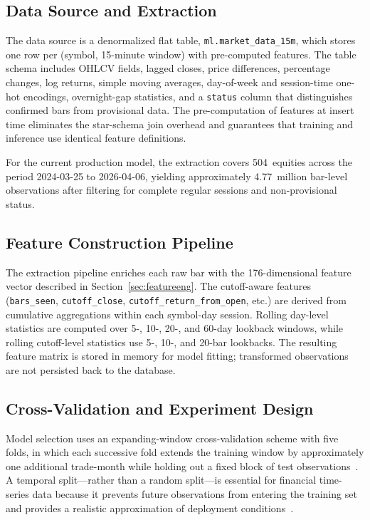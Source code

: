 \documentclass[conference]{IEEEtran}
\begin{document}
\subsection{Data Source and Extraction}\label{sec:datasource}

The data source is a denormalized flat table, \texttt{ml.market\_data\_15m}, which stores one row per (symbol, 15-minute window) with pre-computed features. The table schema includes OHLCV fields, lagged closes, price differences, percentage changes, log returns, simple moving averages, day-of-week and session-time one-hot encodings, overnight-gap statistics, and a \texttt{status} column that distinguishes confirmed bars from provisional data. The pre-computation of features at insert time eliminates the star-schema join overhead and guarantees that training and inference use identical feature definitions.

For the current production model, the extraction covers 504~equities across the period 2024-03-25 to 2026-04-06, yielding approximately 4.77~million bar-level observations after filtering for complete regular sessions and non-provisional status.

\subsection{Feature Construction Pipeline}

The extraction pipeline enriches each raw bar with the 176-dimensional feature vector described in Section~\ref{sec:featureeng}. The cutoff-aware features (\texttt{bars\_seen}, \texttt{cutoff\_close}, \texttt{cutoff\_return\_from\_open}, etc.) are derived from cumulative aggregations within each symbol-day session. Rolling day-level statistics are computed over 5-, 10-, 20-, and 60-day lookback windows, while rolling cutoff-level statistics use 5-, 10-, and 20-bar lookbacks. The resulting feature matrix is stored in memory for model fitting; transformed observations are not persisted back to the database.

\subsection{Cross-Validation and Experiment Design}\label{sec:cvdesign}

Model selection uses an expanding-window cross-validation scheme with five folds, in which each successive fold extends the training window by approximately one additional trade-month while holding out a fixed block of test observations~\cite{lopezdeprado2018afml, geron2019handson}. A temporal split---rather than a random split---is essential for financial time-series data because it prevents future observations from entering the training set and provides a realistic approximation of deployment conditions~\cite{tsay2010financial}.
\end{document}

